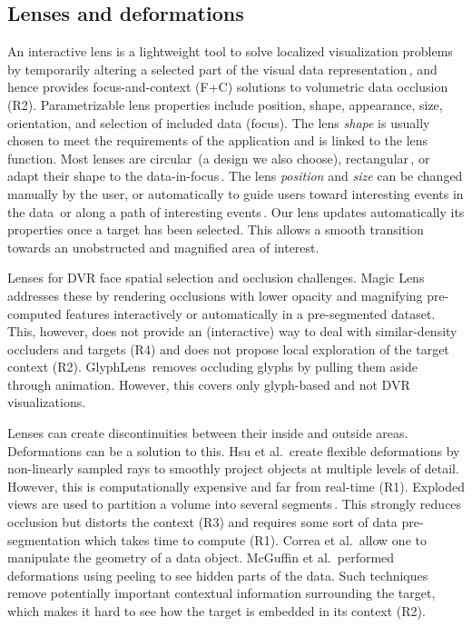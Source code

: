 \subsection{Lenses and deformations}
%
An interactive lens is a lightweight tool to solve localized visualization problems by temporarily altering a selected part of the visual data representation\,\cite{CGF:CGF12871}, and hence provides focus-and-context (F+C) solutions to volumetric data occlusion (R2). Parametrizable lens properties include position, shape, appearance, size, orientation, and selection of included data (focus). The lens \emph{shape} is usually chosen to meet the requirements of the application and is linked to the lens function. Most lenses are circular\,\cite{1648236} (a design we also choose), rectangular\,\cite{Kincaid:2010:SFA:1907651.1907963}, or adapt their shape to the data-in-focus\,\cite{Pindat:2012:JCA:2380116.2380150,Thiede2008}. The lens \emph{position} and \emph{size} can be changed manually by the user, or automatically to guide users toward interesting events in the data\,\cite{Tominski:2011:ECU:2336207.2336211} or along a path of interesting events\,\cite{Alvina:2014:RER:2598153.2598200}. Our lens updates automatically its properties once a target has been selected. This allows a smooth transition towards an unobstructed and magnified area of interest.

Lenses for DVR face spatial selection and occlusion challenges. Magic Lens\,\cite{1532818} addresses these by rendering occlusions with lower opacity and magnifying pre-computed features interactively or automatically in a pre-segmented dataset. This, however, does not provide an (interactive) way to deal with similar-density occluders and targets (R4) and does not propose local exploration of the target context (R2). GlyphLens\,\cite{7539643} removes occluding glyphs by pulling them aside through animation. However, this covers only glyph-based and not DVR visualizations. 

Lenses can create discontinuities between their inside and outside areas. Deformations can be a solution to this.
Hsu et al.\,\cite{Hsu:2011:RFM:2070781.2024165} create flexible deformations by non-linearly sampled rays to smoothly project objects at multiple levels of detail. However, this is computationally expensive and far from real-time (R1). Exploded views are used to partition a volume into several segments\,\cite{Sonnet:2004:IEA:989863.989871,4015467}. This strongly reduces occlusion but distorts the context (R3) and requires some sort of data pre-segmentation which takes time to compute (R1). Correa et al.\,\cite{Correa:2007:IDD:1313046.1313163,Correa:2006:FAV:1187627.1187827} allow one to manipulate the geometry of a data object. McGuffin et al.\,\cite{1250400} performed deformations using peeling to see hidden parts of the data. Such techniques remove potentially important contextual information surrounding the target, which makes it hard to see how the target is embedded in its context (R2).

